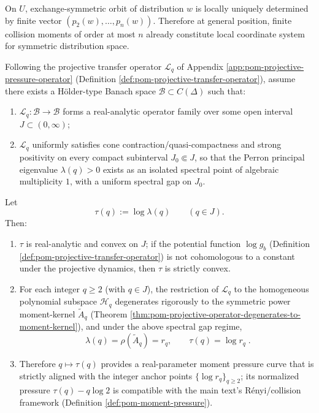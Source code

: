 

\begin{corollary}\label{cor:pom-power-sum-local-chart}
On \(U\), exchange-symmetric orbit of distribution \(w\) is locally uniquely determined by finite vector \((p_2(w),\dots,p_n(w))\).
Therefore at general position, finite collision moments of order at most \(n\) already constitute local coordinate system for symmetric distribution space.
\end{corollary}

\begin{theorem}\label{thm:pom-real-q-pressure-analytic-interpolation}
Following the projective transfer operator \(\mathcal{L}_q\) of Appendix \ref{app:pom-projective-pressure-operator} (Definition \ref{def:pom-projective-transfer-operator}), assume there exists a H\"older-type Banach space \(\mathcal{B}\subset C(\Delta)\) such that:
\begin{enumerate}
  \item \(\mathcal{L}_q:\mathcal{B}\to\mathcal{B}\) forms a real-analytic operator family over some open interval \(J\subset(0,\infty)\);
  \item \(\mathcal{L}_q\) uniformly satisfies cone contraction/quasi-compactness and strong positivity on every compact subinterval \(J_0\Subset J\), so that the Perron principal eigenvalue \(\lambda(q)>0\) exists as an isolated spectral point of algebraic multiplicity \(1\), with a uniform spectral gap on \(J_0\).
\end{enumerate}
Let
\[
\tau(q):=\log\lambda(q)\qquad(q\in J).
\]
Then:
\begin{enumerate}
  \item \(\tau\) is real-analytic and convex on \(J\); if the potential function \(\log g_b\) (Definition \ref{def:pom-projective-transfer-operator}) is not cohomologous to a constant under the projective dynamics, then \(\tau\) is strictly convex.
  \item For each integer \(q\ge 2\) (with \(q\in J\)), the restriction of \(\mathcal{L}_q\) to the homogeneous polynomial subspace \(\mathcal{H}_q\) degenerates rigorously to the symmetric power moment-kernel \(\widetilde A_q\) (Theorem \ref{thm:pom-projective-operator-degenerates-to-moment-kernel}), and under the above spectral gap regime,
  \[
  \boxed{\;
  \lambda(q)=\rho(\widetilde A_q)=r_q,\qquad \tau(q)=\log r_q\; }.
  \]
  \item Therefore \(q\mapsto \tau(q)\) provides a real-parameter moment pressure curve that is strictly aligned with the integer anchor points \(\{\log r_q\}_{q\ge 2}\); its normalized pressure \(\tau(q)-q\log 2\) is compatible with the main text's R\'enyi/collision framework (Definition \ref{def:pom-moment-pressure}).
\end{enumerate}
\end{theorem}

